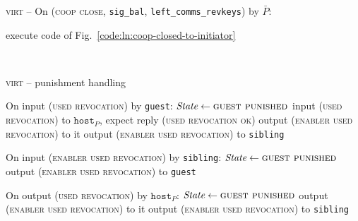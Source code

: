 \begin{center}
\begin{processbox}{\textsc{virt} -- On (\textsc{coop close},
  \texttt{sig\_bal}, \texttt{left\_comms\_revkeys}) by $\bar{P}$:}
\begin{algorithmic}[1]
         
          \State execute code of Fig.~\ref{code:ln:coop-closed-to-initiator}
        \Else \: 
          \State {}
        \EndIf
      \EndIf
    \end{algorithmic}
  \end{processbox}
  \label{code:virtual-layer:coop-close-intermediary}
\end{center} \ \\

\begin{center}
  \begin{processbox}{\textsc{virt} -- punishment handling}
    \begin{algorithmic}[1]
      \State On input (\textsc{used revocation}) by \texttt{guest}:
      \label{code:virtual-layer:punishment:when-punished-1}
      \Indent
        \State $\textit{State} \gets \textsc{guest punished}$
        \State input (\textsc{used revocation}) to $\texttt{host}_P$, expect
        reply (\textsc{used revocation ok})
          \State output (\textsc{enabler used revocation}) to it
        \Else \: 
          \State output (\textsc{enabler used revocation}) to \texttt{sibling}
        \EndIf
      \EndIndent
      \Statex

      \State On input (\textsc{enabler used revocation}) by \texttt{sibling}:
      \Indent
        \State $\textit{State} \gets \textsc{guest punished}$
        \State output (\textsc{enabler used revocation}) to \texttt{guest}
      \EndIndent
      \Statex

      \State On output (\textsc{used revocation}) by $\texttt{host}_P$:
      \label{code:virtual-layer:punishment:when-punished-2}
      \Indent
        \State $\itistate \gets \textsc{guest punished}$
          \State output (\textsc{enabler used revocation}) to it
        \Else \: 
          \State output (\textsc{enabler used revocation}) to \texttt{sibling}
        \EndIf
      \EndIndent
    \end{algorithmic}
  \end{processbox}
  \label{code:virtual-layer:punishment}
\end{center}
